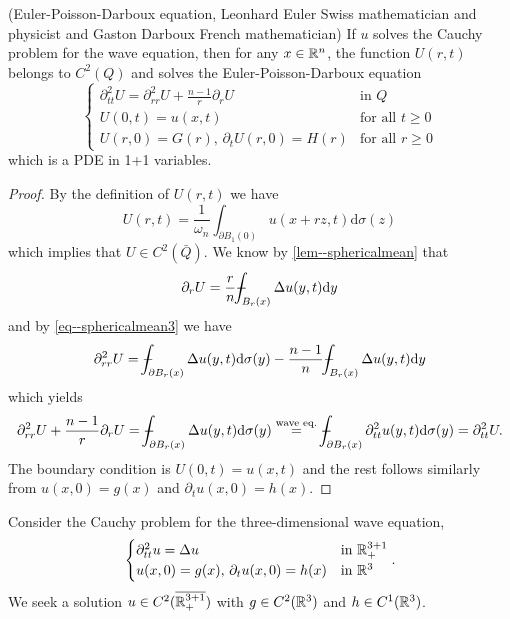 \documentclass[11pt]{article}
\begin{document}
				\begin{prop}
					(Euler-Poisson-Darboux equation, Leonhard Euler Swiss mathematician and physicist and Gaston Darboux French mathematician) If $u$ solves the Cauchy problem for the wave equation, then for any $x\in\mathbb{R}^n$, the function $U(r,t)$ belongs to $C^2(Q)$ and solves the Euler-Poisson-Darboux equation 
					\begin{equation*}
						\begin{cases}
							\partial_{tt}^2U=\partial_{rr}^2U+\frac{n-1}{r}\partial_r U & \text{in }Q\\
							U(0,t)=u(x,t) & \text{for all }t\ge0\\
							U(r,0)=G(r),\,\partial_t U(r,0)=H(r) & \text{for all }r\ge0
						\end{cases}
					\end{equation*}
					which is a PDE in 1+1 variables.
				\end{prop}
				\begin{proof}
					By the definition of $U(r,t)$ we have
					\begin{equation*}
						U(r,t)=\frac{1}{\omega_n}\int_{\partial B_1(0)}u(x+rz,t)\mathrm{d}\sigma(z)
					\end{equation*}
					which implies that $U\in C^2(\bar{Q})$. We know by \autoref{lem--sphericalmean} that
					\begin{equation*}
						\partial_rU=\frac{r}{n}\dashint_{B_r(x)}\Delta u(y,t)\mathrm{d}y
					\end{equation*}
					and by \eqref{eq--sphericalmean3} we have
					\begin{equation*}
						\partial_{rr}^2U=\dashint_{\partial B_r(x)}\Delta u(y,t)\mathrm{d}\sigma(y)-\frac{n-1}{n}\dashint_{B_r(x)}\Delta u(y,t)\mathrm{d}y
					\end{equation*}
					which yields
					\begin{equation*}
						\partial_{rr}^2U+\frac{n-1}{r}\partial_rU=\dashint_{\partial B_r(x)}\Delta u(y,t)\mathrm{d}\sigma(y)\overset{\text{wave eq.}}{=}\dashint_{\partial B_r(x)}\partial_{tt}^2u(y,t)\mathrm{d}\sigma(y)=\partial_{tt}^2U.
					\end{equation*}
					The boundary condition is $U(0,t)=u(x,t)$ and the rest follows similarly from $u(x,0)=g(x)$ and $\partial_tu(x,0)=h(x)$.
				\end{proof}


				Consider the Cauchy problem for the three-dimensional wave equation,
				\begin{equation}\label{eq--wave3d}
					\begin{cases}
						\partial_{tt}^2u=\Delta u & \text{in }\mathbb{R}^{3+1}_+\\
						u(x,0)=g(x),\,\partial_tu(x,0)=h(x) & \text{in }\mathbb{R}^3
					\end{cases}.
				\end{equation}
				We seek a solution $u\in C^2(\overline{\mathbb{R}^{3+1}_+})$ with $g\in C^2(\mathbb{R}^3)$ and $h\in C^1(\mathbb{R}^3)$.
\end{document}
